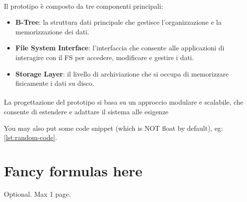 \documentclass[12pt,a4paper,openright,twoside]{book}
\begin{document}
            \paragraph*{}

            Il prototipo è composto da tre componenti principali:

            \begin{itemize}
                \item \textbf{B-Tree}: la struttura dati principale che gestisce l'organizzazione e la memorizzazione dei dati.
                \item \textbf{File System Interface}: l'interfaccia che consente alle applicazioni di interagire con il \ac{FS} per accedere, modificare e gestire i dati.
                \item \textbf{Storage Layer}: il livello di archiviazione che si occupa di memorizzare fisicamente i dati su disco.
            \end{itemize}

            \paragraph*{}

            La progettazione del prototipo si basa su un approccio modulare e scalabile, che consente di estendere e adattare il sistema alle esigenze

You may also put some code snippet (which is NOT float by default), eg: \cref{lst:random-code}.



\section{Fancy formulas here}


\backmatter

\nocite{*} %




\begin{acknowledgements} %
Optional. Max 1 page.
\end{acknowledgements}
\end{document}
